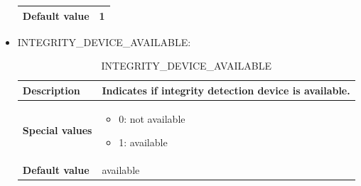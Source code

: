 \documentclass{template/openetcs}
\begin{document}
\begin{itemize}
\begin{longtable}{|l|l|}
					\begin{minipage}[t]{0.22\linewidth} \textbf{Default value}	\end{minipage} 
				&	\begin{minipage}[t]{0.78\linewidth} 1 \end{minipage} \\
				
				\hline
				
			\end{longtable}
			
		\item INTEGRITY\_DEVICE\_AVAILABLE:
						
			\begin{longtable}{|l|l|}
				\caption{INTEGRITY\_DEVICE\_AVAILABLE}\\ 
				\hline
				
					\begin{minipage}[t]{0.22\linewidth} \textbf{Description}	\end{minipage} 
				&	\begin{minipage}[t]{0.78\linewidth} Indicates if integrity detection device is available. \end{minipage} \\
				
				\hline
																																									
					\begin{minipage}[t]{0.22\linewidth} \textbf{Special values}	\end{minipage} 
				&	\begin{minipage}[t]{0.78\linewidth} \begin{itemize} \item 0: not available \item 1: available \end{itemize} \end{minipage} \\
				
				\hline
				
					\begin{minipage}[t]{0.22\linewidth} \textbf{Default value}	\end{minipage} 
				&	\begin{minipage}[t]{0.78\linewidth} available \end{minipage} \\
				
				\hline
				
			\end{longtable}
			

\end{itemize}
\end{document}
